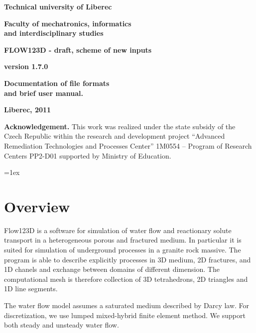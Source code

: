 \documentclass[12pt,a4paper]{report}
\begin{document}
\thispagestyle{empty}
\begin{center}
\noindent 
\textbf{\LARGE{
  Technical university of Liberec
}}

\vspace{2ex}
\textbf{\LARGE{
  Faculty of mechatronics, informatics\\
  and interdisciplinary studies
}}

\vspace{160pt}

\textbf{\Huge{
FLOW123D - draft, scheme of new inputs
}}

\vspace{1cm}
\textbf{\Large{
version 1.7.0
}}

\vspace{1cm}

\textbf{\Large{
Documentation of file formats \\
and brief user manual.
}}


\vspace{7cm}

\noindent \textbf{\Large{Liberec, 2011}}

\vspace{1cm}

{\bf Acknowledgement.} This work was realized under the state  subsidy of the Czech Republic within the research and development 
project ``Advanced Remediation Technologies and Processes Center'' 1M0554 
-- Program of Research Centers PP2-D01 supported by Ministry of Education.
\end{center}
\noindent 

\noindent


\parindent=0pt
\parskip=1ex

\chapter{Overview}
Flow123D is a software for simulation of water flow and reactionary solute transport in a heterogeneous 
porous and fractured medium. In particular it is suited for simulation of underground processes in a granite rock massive.
The program is able to describe explicitly processes in 3D medium, 2D fractures, and 1D chanels and exchange between 
domains of different dimension. The computational mesh is therefore collection of 3D tetrahedrons, 2D triangles and 1D line segments.

The water flow model assumes a saturated medium described by Darcy law. For discretization, we use lumped mixed-hybrid finite element method.
We support both steady and unsteady water flow.
\end{document}
